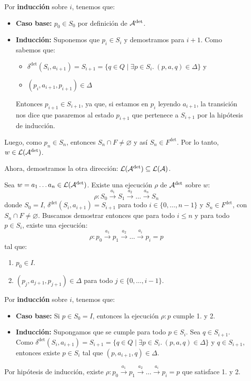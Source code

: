 Por \textbf{inducción} sobre $i$, tenemos que:
\begin{itemize}
    \item \textbf{Caso base:} $p_0 \in S_0$ por definición de $\mathcal{A}^\text{det}$.
    \item \textbf{Inducción:} Suponemos que $p_i \in S_i$ y demostramos para $i+1$. Como sabemos que:
          \begin{itemize}
              \item $\delta^\text{det}(S_i,a_{i+1})=S_{i+1} = \{q \in Q \mid \exists p \in S_i.\ (p,a,q) \in \Delta \}$ y
              \item $(p_i,a_{i+1},p_{i+1}) \in \Delta$
          \end{itemize}
          Entonces $p_{i+1} \in S_{i+1}$, ya que, si estamos en $p_i$ leyendo $a_{i+1}$, la transición nos dice que pasaremos al estado $p_{i+1}$ que pertenece a $S_{i+1}$ por la hipótesis de inducción.
\end{itemize}
Luego, como $p_n \in S_n$, entonces $S_n \cap F \neq \varnothing$ y así $S_n \in F^\text{det}$. Por lo tanto, $w \in \mathcal{L}(\mathcal{A}^\text{det})$. \medbreak

Ahora, demostramos la otra dirección: $\mathcal{L}(\mathcal{A}^\text{det}) \subseteq \mathcal{L}(\mathcal{A})$. \medbreak

Sea $w = a_1\ldots a_n \in \mathcal{L}(\mathcal{A}^\text{det})$. Existe una ejecución $\rho$ de $\mathcal{A}^\text{det}$ sobre $w$:
$$
    \rho: S_0 \stackrel{a_1}{\rightarrow} S_1 \stackrel{a_2}{\rightarrow} \ldots \stackrel{a_n}{\rightarrow} S_n
$$
donde $S_0 = I$, $\delta^\text{det}(S_i, a_{i+1}) = S_{i+1}$ para todo $i \in \{0,\ldots,n-1\}$ y $S_n \in F^\text{det}$, con $S_n \cap F \neq \varnothing$. Buscamos demostrar entonces que para todo $i \leq n$ y para todo $p \in S_i$, existe una ejecución:
$$
    \rho: p_0 \stackrel{a_1}{\rightarrow} p_1 \stackrel{a_2}{\rightarrow} \ldots \stackrel{a_i}{\rightarrow} p_i=p
$$
tal que:
\begin{enumerate}
    \item $p_0 \in I$.
    \item $(p_j, a_{j+1}, p_{j+1}) \in \Delta$ para todo $j \in \{0,\ldots,i-1\}$.
\end{enumerate}
Por \textbf{inducción} sobre $i$, tenemos que:
\begin{itemize}
    \item \textbf{Caso base:} Si $p \in S_0 = I$, entonces la ejecución $\rho: p$ cumple 1. y 2.
    \item \textbf{Inducción:} Supongamos que se cumple para todo $p \in S_i$. Sea $q \in S_{i+1}$. Como $\delta^\text{det}(S_i,a_{i+1})=S_{i+1}=\{q \in Q \mid \exists p \in S_i.\ (p,a,q)\in \Delta\}$ y $q \in S_{i+1}$, entonces existe $p \in S_i$ tal que $(p,a_{i+1},q) \in \Delta$.
\end{itemize}
Por hipótesis de inducción, existe $\rho: p_0 \stackrel{a_1}{\rightarrow} p_1 \stackrel{a_2}{\rightarrow} \ldots \stackrel{a_i}{\rightarrow} p_i=p$ que satisface 1. y 2. \medbreak


